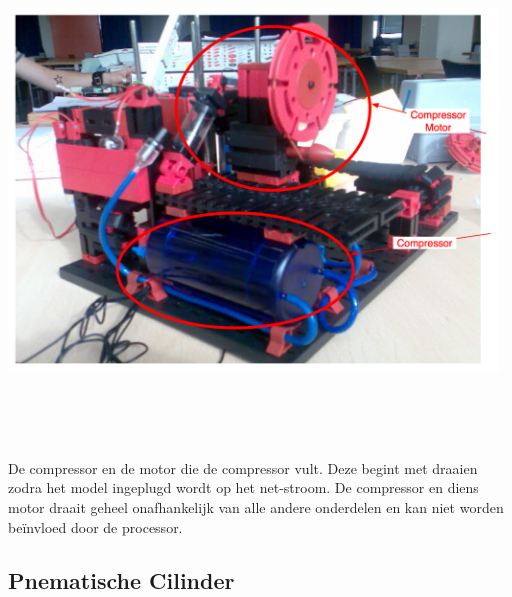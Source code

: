 \includegraphics[width=13cm, height=14cm]{compressor} \\
De compressor en de motor die de compressor vult. Deze begint met draaien zodra het model ingeplugd wordt op het net-stroom. De compressor en diens motor draait geheel onafhankelijk van alle andere onderdelen en kan niet worden be\"invloed door de processor.




\subsection{Pnematische Cilinder}\label{sub:pnematische_cilinder} %

